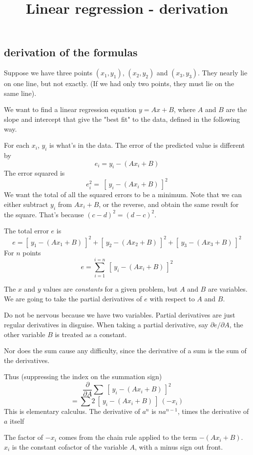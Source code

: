 \documentclass[11pt, oneside]{article}
\title{Linear regression - derivation}
\date{}
\begin{document}
\maketitle
\Large

\subsection*{derivation of the formulas}
Suppose we have three points $(x_1,y_1)$, $(x_2,y_2)$ and $(x_3,y_3)$.  They nearly lie on one line, but not exactly.  (If we had only two points, they must lie on the same line).

We want to find a linear regression equation $y = Ax + B$, where $A$ and $B$ are the slope and intercept that give the "best fit" to the data, defined in the following way.  

For each $x_i$, $y_i$ is what's in the data.  The error of the predicted value is different by
\[ e_i = y_i - (Ax_i + B) \]
The error squared is
\[ e_i^2 = \ [ \ y_i - (Ax_i + B) \ ]^2 \]
We want the total of all the squared errors to be a minimum.  Note that we can either subtract $y_i$ from $Ax_i + B$, or the reverse, and obtain the same result for the square.  That's because $(c - d)^2 = (d - c)^2$.

The total error $e$ is
\[ e =  [ \ y_1 - (Ax_1 + B) \ ]^2 +  [ \ y_2 - (Ax_2 + B) \ ]^2 +  [ \ y_3 - (Ax_3+ B) \ ]^2 \]
For $n$ points
\[ e = \sum_{i=1}^{i=n}  \ [ \ y_i - (Ax_i + B) \ ]^2 \]

The $x$ and $y$ values are \emph{constants} for a given problem, but $A$ and $B$ are variables.  We are going to take the partial derivatives of $e$ with respect to $A$ and $B$.  

Do not be nervous because we have two variables.  Partial derivatives are just regular derivatives in disguise.  When taking a partial derivative, say $\partial e/\partial A$, the other variable $B$ is treated as a constant.

Nor does the sum cause any difficulty, since the derivative of a sum is the sum of the derivatives.  

Thus (suppressing the index on the summation sign)
\[ \frac{\partial}{\partial A} \sum  \ [ \ y_i - (Ax_i + B) \ ]^2 \]
\[ = \sum  2 \ [ \ y_i - (Ax_i + B) \ ] \ (-x_i) \]
This is elementary calculus.  The derivative of $a^n$ is $na^{n-1}$, times the derivative of $a$ itself

The factor of $-x_i$ comes from the chain rule applied to the term $-(Ax_i + B)$.  $x_i$ is the constant cofactor of the variable $A$, with a minus sign out front.
\end{document}
